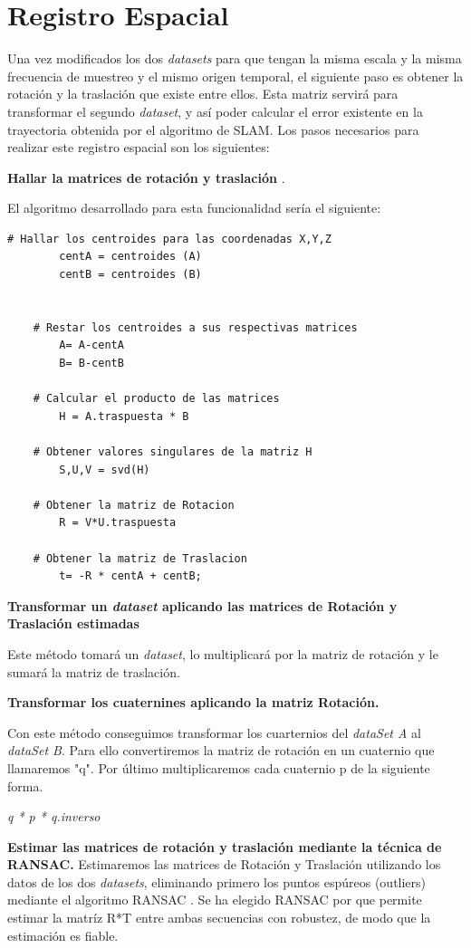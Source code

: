 \section{Registro Espacial}
Una vez modificados los dos \textit{datasets} para que tengan la misma escala y la misma frecuencia de muestreo y el mismo origen temporal, el siguiente paso es obtener la rotación y la traslación que existe entre ellos. Esta matriz servirá para transformar el segundo \textit{dataset}, y así poder calcular el error existente en la trayectoria obtenida por el algoritmo de SLAM.
Los pasos necesarios para realizar este registro espacial son los siguientes:

\textbf{Hallar la matrices de rotación y traslación} .

	El algoritmo desarrollado para esta funcionalidad sería el siguiente:
    \begin{lstlisting}[frame=single]
    # Hallar los centroides para las coordenadas X,Y,Z 
    	centA = centroides (A)
    	centB = centroides (B)
    

    # Restar los centroides a sus respectivas matrices
      	A= A-centA
      	B= B-centB
    
    # Calcular el producto de las matrices
    	H = A.traspuesta * B

    # Obtener valores singulares de la matriz H
    	S,U,V = svd(H)
    
    # Obtener la matriz de Rotacion
      	R = V*U.traspuesta

    # Obtener la matriz de Traslacion
    	t= -R * centA + centB;  
    \end{lstlisting}

\textbf{Transformar un \textit{dataset} aplicando las matrices de Rotación y Traslación estimadas}

Este método tomará un \textit{dataset}, lo multiplicará por la matriz de rotación y le sumará la matriz de traslación.

\textbf{Transformar los cuaternines aplicando la matriz Rotación.}

Con este método conseguimos transformar los cuarternios del \textit{dataSet A} al \textit{dataSet B}. Para ello convertiremos la matriz de rotación en un cuaternio que llamaremos "q". Por último multiplicaremos cada cuaternio p de la siguiente forma.
\begin{center}
		\textit{q * p * q.inverso }
\end{center}

\textbf{Estimar las matrices de rotación y traslación mediante la técnica de RANSAC.}
Estimaremos las matrices de Rotación y Traslación utilizando los datos de los dos \textit{datasets}, eliminando primero los puntos espúreos (outliers) mediante el algoritmo RANSAC \cite{Fischler:1981:RSC:358669.358692}.
Se ha elegido RANSAC por que permite estimar la matríz R*T entre ambas secuencias con robustez, de modo que la estimación es fiable.



